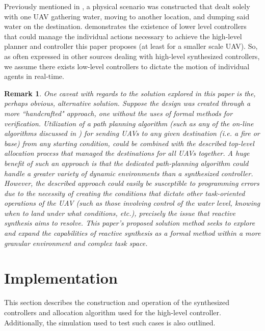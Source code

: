 \documentclass{ieeeaccess}
\newtheorem{rem}{Remark}
\begin{document}
Previously mentioned in \cite{c2}, a physical scenario was constructed that dealt solely with one UAV gathering water, moving to another location, and dumping said water on the destination. \cite{c2} demonstrates the existence of lower level controllers that could manage the individual actions necessary to achieve the high-level planner and controller this paper proposes (at least for a smaller scale UAV). So, as often expressed in other sources dealing with high-level synthesized controllers, we assume there exists low-level controllers to dictate the motion of individual agents in real-time.

\begin{rem}
	One caveat with regards to the solution explored in this paper is the, perhaps obvious, alternative solution. Suppose the design was created through a more ``handcrafted" approach, one without the uses of formal methods for verification. Utilization of a path planning algorithm (such as any of the on-line algorithms discussed in \cite{c18}) for sending UAVs to any given destination (i.e. a fire or base) from any starting condition, could be combined with the described top-level allocation process that managed the destinations for all UAVs together. A huge benefit of such an approach is that the dedicated path-planning algorithm could handle a greater variety of dynamic environments than a synthesized controller. However, the described approach could easily be susceptible to programming errors due to the necessity of creating the conditions that dictate other task-oriented operations of the UAV (such as those involving control of the water level, knowing when to land under what conditions, etc.), precisely the issue that reactive synthesis aims to resolve. This paper's proposed solution method seeks to explore and expand the capabilities of reactive synthesis as a formal method within a more granular environment and complex task space.
\end{rem}

\section{Implementation}

This section describes the construction and operation of the synthesized controllers and allocation algorithm used for the high-level controller. Additionally, the simulation used to test such cases is also outlined.

\end{document}
